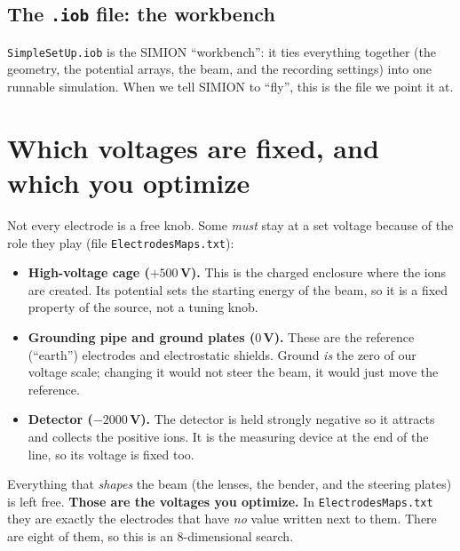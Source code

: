 \documentclass[11pt]{article}
\begin{document}
\subsection{The \texttt{.iob} file: the workbench}
\texttt{SimpleSetUp.iob} is the SIMION ``workbench'': it ties everything
together (the geometry, the potential arrays, the beam, and the recording
settings) into one runnable simulation. When we tell SIMION to ``fly'', this
is the file we point it at.

\section{Which voltages are fixed, and which you optimize}

Not every electrode is a free knob. Some \emph{must} stay at a set voltage
because of the role they play (file \texttt{ElectrodesMaps.txt}):

\begin{itemize}[nosep]
  \item \textbf{High-voltage cage ($+500$\,V).} This is the charged enclosure
        where the ions are created. Its potential sets the starting energy of
        the beam, so it is a fixed property of the source, not a tuning knob.
  \item \textbf{Grounding pipe and ground plates ($0$\,V).} These are the
        reference (``earth'') electrodes and electrostatic shields. Ground
        \emph{is} the zero of our voltage scale; changing it would not steer
        the beam, it would just move the reference.
  \item \textbf{Detector ($-2000$\,V).} The detector is held strongly negative
        so it attracts and collects the positive ions. It is the measuring
        device at the end of the line, so its voltage is fixed too.
\end{itemize}

Everything that \emph{shapes} the beam (the lenses, the bender, and the
steering plates) is left free. \textbf{Those are the voltages you optimize.}
In \texttt{ElectrodesMaps.txt} they are exactly the electrodes that have
\emph{no} value written next to them. There are eight of them, so this is an
8-dimensional search.
\end{document}
